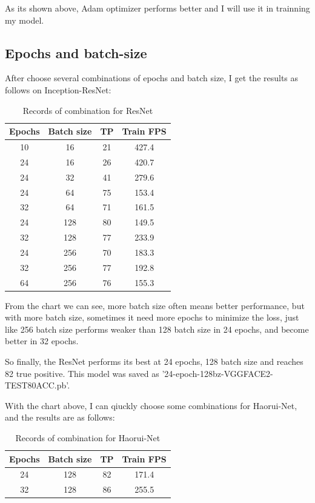 \documentclass{article}
\begin{document}
As its shown above, Adam optimizer performs better and I will use it in trainning my model.
\subsection{Epochs and batch-size}
After choose several combinations of epochs and batch size,  I get the results as follows on Inception-ResNet:

\begin{table}[!htbp]
\centering
\caption{Records of combination for ResNet}\label{tab:aStrangeTable}%
\begin{tabular}{cccc}
\toprule
Epochs & Batch size& TP &Train FPS\\
\midrule
10& 16 & 21 & 427.4\\
24& 16& 26 & 420.7\\
24 & 32 & 41 & 279.6\\
24 & 64 & 75 & 153.4\\
32 & 64 & 71 & 161.5\\
24 & 128 & 80 & 149.5\\
32 & 128 & 77 & 233.9\\
24 & 256 & 70  &183.3\\
32 & 256 & 77  &192.8\\
64 & 256 & 76  &155.3\\
\bottomrule
\end{tabular}

\end{table}
From the chart we can see, more batch size often means better performance, but with more batch size, sometimes it need more epochs to minimize the loss, just like 256 batch size performs weaker than 128 batch size in 24 epochs, and become better in 32 epochs.

So finally, the ResNet performs its best at 24 epochs, 128 batch size and reaches 82 true positive. This model was saved as  '24-epoch-128bz-VGGFACE2-TEST80ACC.pb'.

With the chart above, I can qiuckly choose some combinations for Haorui-Net, and the results are as follows:

\begin{table}[!htbp]
\centering
\caption{Records of combination for Haorui-Net}\label{tab:aStrangeTable}%
\begin{tabular}{cccc}
\toprule
Epochs & Batch size& TP &Train FPS\\
\midrule
24 & 128 & 82 & 171.4\\
32 & 128 & 86 & 255.5\\
\bottomrule
\end{tabular}
\end{table}
\end{document}
